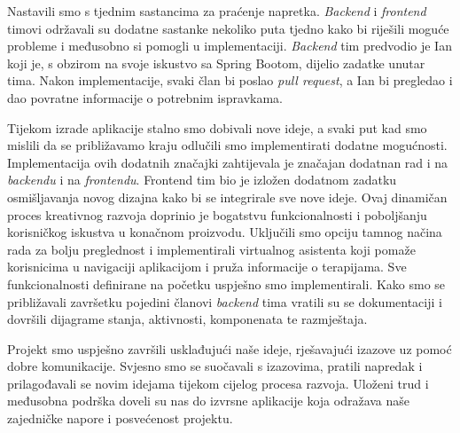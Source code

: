 Nastavili smo s tjednim sastancima za praćenje napretka. \textit{Backend} i \textit{frontend} timovi održavali su dodatne sastanke nekoliko puta tjedno kako bi riješili moguće probleme i međusobno si pomogli u implementaciji. \textit{Backend} tim predvodio je Ian koji je, s obzirom na svoje iskustvo sa Spring Bootom, dijelio zadatke unutar tima. Nakon implementacije, svaki član bi poslao \textit{pull request}, a Ian bi pregledao i dao povratne informacije o potrebnim ispravkama.

Tijekom izrade aplikacije stalno smo dobivali nove ideje, a svaki put kad smo mislili da se približavamo kraju odlučili smo implementirati dodatne mogućnosti. Implementacija ovih dodatnih značajki zahtijevala je značajan dodatnan rad i na \textit{backendu} i na \textit{frontendu}. Frontend tim bio je izložen dodatnom zadatku osmišljavanja novog dizajna kako bi se integrirale sve nove ideje. Ovaj dinamičan proces kreativnog razvoja doprinio je bogatstvu funkcionalnosti i poboljšanju korisničkog iskustva u konačnom proizvodu. Uključili smo opciju tamnog načina rada za bolju preglednost i implementirali virtualnog asistenta koji pomaže korisnicima u navigaciji aplikacijom i pruža informacije o terapijama. Sve funkcionalnosti definirane na početku uspješno smo implementirali. Kako smo se približavali završetku pojedini članovi \textit{backend} tima vratili su se dokumentaciji i dovršili dijagrame stanja, aktivnosti, komponenata te razmještaja. 

Projekt smo uspješno završili usklađujući naše ideje, rješavajući izazove uz pomoć dobre komunikacije. Svjesno smo se suočavali s izazovima, pratili napredak i prilagođavali se novim idejama tijekom cijelog procesa razvoja. Uloženi trud i međusobna podrška doveli su nas do izvrsne aplikacije koja odražava naše zajedničke napore i posvećenost projektu. 
